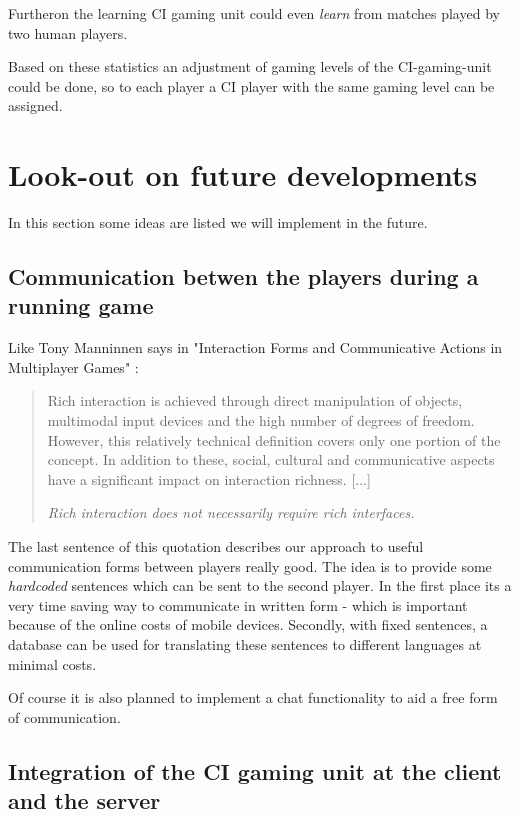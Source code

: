 		Furtheron the learning CI gaming unit could even \textit{learn} from
		matches played by two human players.
		
		Based on these statistics an adjustment of gaming levels of the
		CI-gaming-unit could be done, so to each player a CI player with the
		same gaming level can be assigned.


\section{Look-out on future developments}

	In this section some ideas are listed we will implement in the future.
	
	\subsection{Communication betwen the players during a running game}
	
		Like Tony Manninnen says in "Interaction Forms and Communicative Actions
		in Multiplayer Games" \cite{mann03}:
		
		\begin{quotation}
		
			Rich interaction is achieved through direct manipulation of objects,
			multimodal input devices and the high number of degrees of freedom.
			However, this relatively technical definition covers only one
			portion of the concept. In addition to these, social, cultural and
			communicative aspects have a significant impact on interaction
			richness. [...]
		
			\textit{Rich interaction does not necessarily require rich
			interfaces.}
			
		\end{quotation}
		
		The last sentence of this quotation describes our approach to useful
		communication forms between players really good. The idea is to provide
		some \emph{hardcoded} sentences which can be sent to the second player.
		In the first place its a very time saving way to communicate in written
		form - which is important because of the online costs of mobile devices.
		Secondly, with fixed sentences, a database can be used for translating
		these sentences to different languages at minimal costs.
		
		Of course it is also planned to implement a chat functionality to aid a
		free form of communication.
	
	\subsection{Integration of the CI gaming unit at the client and the server}

